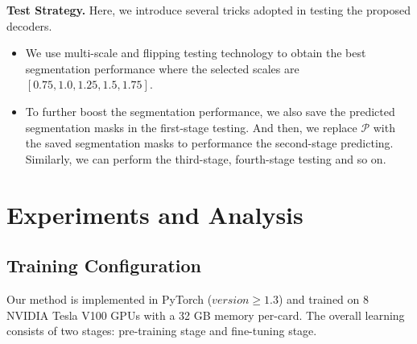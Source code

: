 \documentclass[10pt,twocolumn,letterpaper]{article}
\begin{document}
\noindent \textbf{Test Strategy.} 
Here, we introduce several tricks adopted in testing the proposed decoders.
\begin{itemize}
   \item We use multi-scale and flipping testing technology to obtain the best segmentation performance where the selected scales are $[0.75, 1.0, 1.25, 1.5, 1.75]$.
   \item To further boost the segmentation performance, we also save the predicted segmentation masks in the first-stage testing. And then, we replace $\mathcal{P}$ with the saved segmentation masks to performance the second-stage predicting.
   Similarly, we can perform the third-stage, fourth-stage testing and so on.
\end{itemize}




\begin{table}[t]
\centering
\caption{
   Ablation study of multi-stage inference on the validation set of VSPW. All the models are trained on the train set and tested under single-scale.
}\label{table2}
\end{table}



\section{Experiments and Analysis} \label{exp}

\subsection{Training Configuration}
Our method is implemented in PyTorch ($version \geq 1.3$) \cite{paszke2019pytorch} and trained on 8 NVIDIA Tesla V100 GPUs with a 32 GB memory per-card.
The overall learning consists of two stages: pre-training stage and fine-tuning stage.
\end{document}
